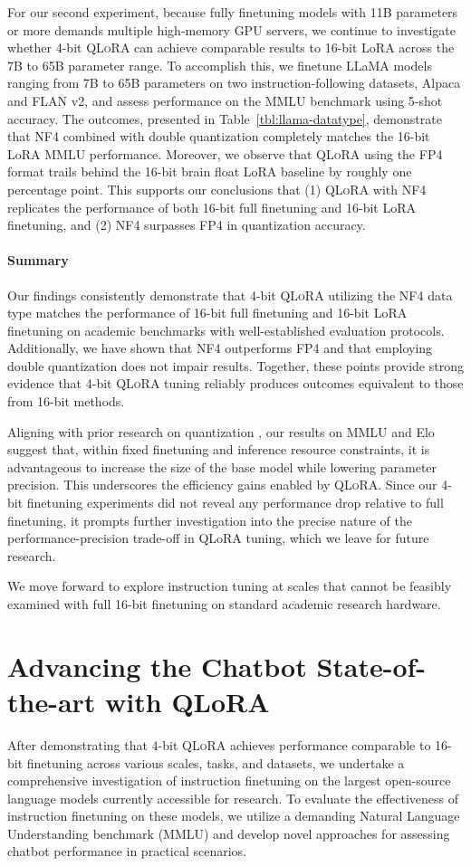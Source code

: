 For our second experiment, because fully finetuning models with 11B parameters or more demands multiple high-memory GPU servers, we continue to investigate whether 4-bit \textsc{QLoRA} can achieve comparable results to 16-bit LoRA across the 7B to 65B parameter range. To accomplish this, we finetune LLaMA models ranging from 7B to 65B parameters on two instruction-following datasets, Alpaca and FLAN v2, and assess performance on the MMLU benchmark using 5-shot accuracy. The outcomes, presented in Table~\ref{tbl:llama-datatype}, demonstrate that NF4 combined with double quantization completely matches the 16-bit LoRA MMLU performance. Moreover, we observe that \textsc{QLoRA} using the FP4 format trails behind the 16-bit brain float LoRA baseline by roughly one percentage point. This supports our conclusions that (1) \textsc{QLoRA} with NF4 replicates the performance of both 16-bit full finetuning and 16-bit LoRA finetuning, and (2) NF4 surpasses FP4 in quantization accuracy.

\paragraph{Summary} Our findings consistently demonstrate that 4-bit \textsc{QLoRA} utilizing the NF4 data type matches the performance of 16-bit full finetuning and 16-bit LoRA finetuning on academic benchmarks with well-established evaluation protocols. Additionally, we have shown that NF4 outperforms FP4 and that employing double quantization does not impair results. Together, these points provide strong evidence that 4-bit \textsc{QLoRA} tuning reliably produces outcomes equivalent to those from 16-bit methods.

Aligning with prior research on quantization \citep{dettmers2022case}, our results on MMLU and Elo suggest that, within fixed finetuning and inference resource constraints, it is advantageous to increase the size of the base model while lowering parameter precision. This underscores the efficiency gains enabled by \textsc{QLoRA}. Since our 4-bit finetuning experiments did not reveal any performance drop relative to full finetuning, it prompts further investigation into the precise nature of the performance-precision trade-off in QLoRA tuning, which we leave for future research.

We move forward to explore instruction tuning at scales that cannot be feasibly examined with full 16-bit finetuning on standard academic research hardware.

\section{Advancing the Chatbot State-of-the-art with QLoRA}
\label{sec:pushing}
After demonstrating that 4-bit \textsc{QLoRA} achieves performance comparable to 16-bit finetuning across various scales, tasks, and datasets, we undertake a comprehensive investigation of instruction finetuning on the largest open-source language models currently accessible for research. To evaluate the effectiveness of instruction finetuning on these models, we utilize a demanding Natural Language Understanding benchmark (MMLU) and develop novel approaches for assessing chatbot performance in practical scenarios.

